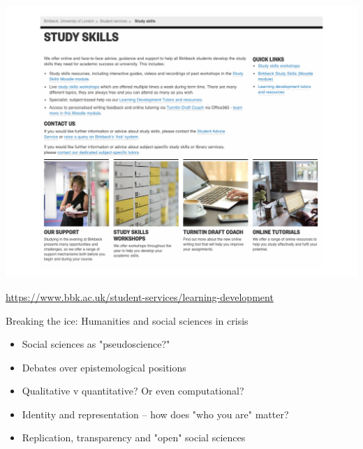 \documentclass[
  10pt,
  ignorenonframetext,
]{beamer}
\begin{document}
\begin{frame}
\begin{center}\includegraphics[width=0.9\linewidth]{Figs/study} \end{center}
\vspace{0.1cm}
\begin{center}
\url{https://www.bbk.ac.uk/student-services/learning-development}
\end{center}
\end{frame}

\begin{frame}{Breaking the ice: Humanities and social sciences in
crisis}
\protect\hypertarget{breaking-the-ice-humanities-and-social-sciences-in-crisis}{}
\begin{itemize}
  \item Social sciences as "pseudoscience?"
  \vspace{0.5cm}
  \item Debates over epistemological positions
  \vspace{0.5cm}
  \item Qualitative v quantitative? Or even computational?
  \vspace{0.5cm}
  \item Identity and representation -- how does "who you are" matter?
  \vspace{0.5cm}
  \item Replication, transparency and "open" social sciences
\end{itemize}
\end{frame}
\end{document}
